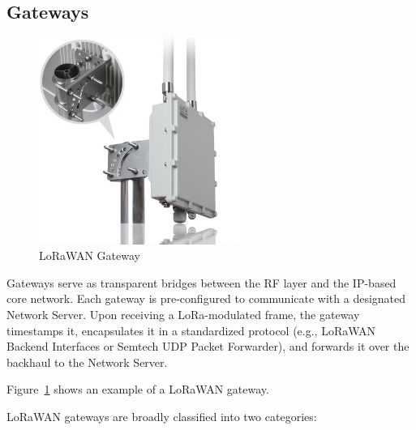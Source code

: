 \subsection{Gateways}
\begin{figure}
    \centering
    \includegraphics[width=0.6\textwidth]{figures/Ethernet-4G-Lorawan-Outdoor-Gateway-for-Remote-Street-Light-Management.png}
    \caption{LoRaWAN Gateway}
    \label{fig:lora_gateway}
\end{figure}
Gateways serve as transparent bridges between the RF layer and the IP-based core network. Each gateway is pre-configured to communicate with a designated Network Server. Upon receiving a LoRa-modulated frame, the gateway timestamps it, encapsulates it in a standardized protocol (e.g., LoRaWAN Backend Interfaces or Semtech UDP Packet Forwarder), and forwards it over the backhaul to the Network Server.

Figure~\ref{fig:lora_gateway} shows an example of a LoRaWAN gateway.

LoRaWAN gateways are broadly classified into two categories:

